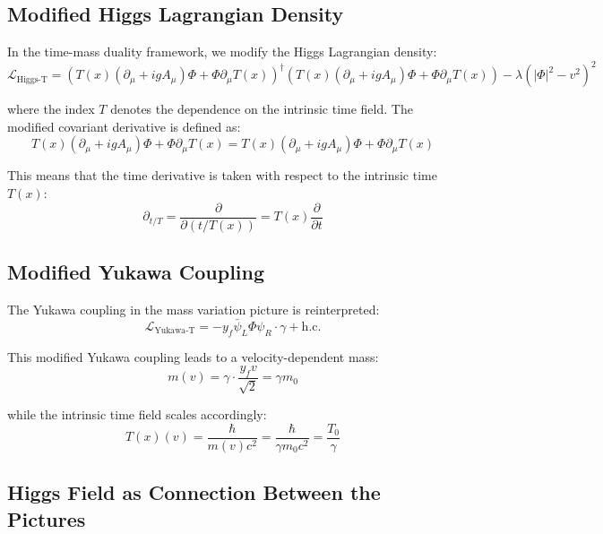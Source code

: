 \documentclass[a4paper,12pt]{article}
\newcommand{\Tfield}{T(x)} %
\newcommand{\DhiggsT}{\Tfield (\partial_\mu + igA_\mu)\Phi + \Phi \partial_\mu \Tfield}
\begin{document}
	\subsection{Modified Higgs Lagrangian Density}
	
	In the time-mass duality framework, we modify the Higgs Lagrangian density:
	\begin{equation}
		\mathcal{L}_{\text{Higgs-T}} = (\DhiggsT)^\dagger (\DhiggsT) - \lambda(|\Phi|^2 - v^2)^2
	\end{equation}
	
	where the index $T$ denotes the dependence on the intrinsic time field. The modified covariant derivative is defined as:
	\begin{equation}
		\DhiggsT = \Tfield (\partial_\mu + igA_\mu)\Phi + \Phi \partial_\mu \Tfield
	\end{equation}
	
	This means that the time derivative is taken with respect to the intrinsic time $\Tfield$:
	\begin{equation}
		\partial_{t/T} = \frac{\partial}{\partial(t/\Tfield)} = \Tfield\frac{\partial}{\partial t}
	\end{equation}
	
	\subsection{Modified Yukawa Coupling}
	
	The Yukawa coupling in the mass variation picture is reinterpreted:
	\begin{equation}
		\mathcal{L}_{\text{Yukawa-T}} = -y_f \bar{\psi}_L \Phi \psi_R \cdot \gamma + \text{h.c.}
	\end{equation}
	
	This modified Yukawa coupling leads to a velocity-dependent mass:
	\begin{equation}
		m(v) = \gamma \cdot \frac{y_f v}{\sqrt{2}} = \gamma m_0
	\end{equation}
	
	while the intrinsic time field scales accordingly:
	\begin{equation}
		\Tfield(v) = \frac{\hbar}{m(v)c^2} = \frac{\hbar}{\gamma m_0 c^2} = \frac{T_0}{\gamma}
	\end{equation}
	
	\subsection{Higgs Field as Connection Between the Pictures}
	
\end{document}
